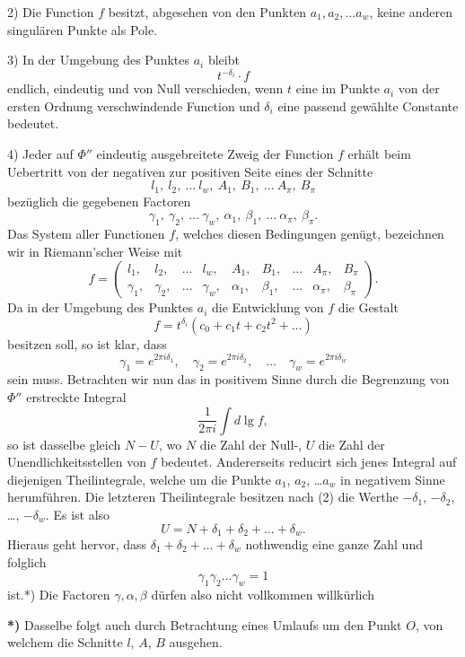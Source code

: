\documentclass{article}
\begin{document}
2) Die Function $f$ besitzt, abgesehen von den Punkten $a_1, a_2, \dots a_w$, keine anderen singulären Punkte als Pole.

3) In der Umgebung des Punktes $a_i$ bleibt
\[
t^{-\delta_i} \cdot f
\]
endlich, eindeutig und von Null verschieden, wenn $t$ eine im Punkte $a_i$ von der ersten Ordnung verschwindende Function und $\delta_i$ eine passend gewählte Constante bedeutet.

4) Jeder auf $\Phi''$ eindeutig ausgebreitete Zweig der Function $f$ erhält beim Uebertritt von der negativen zur positiven Seite eines der Schnitte
\[
l_1, \ l_2, \ \dots \ l_w, \ A_1, \ B_1, \ \dots \ A_\pi, \ B_\pi
\]
bezüglich die gegebenen Factoren
\[
\gamma_1, \ \gamma_2, \ \dots \ \gamma_w, \ \alpha_1, \ \beta_1, \ \dots \ \alpha_\pi, \ \beta_\pi.
\]
Das System aller Functionen $f$, welches diesen Bedingungen genügt, bezeichnen wir in Riemann'scher Weise mit
\[
f = \begin{pmatrix}
l_1, & l_2, & \dots & l_w, & A_1, & B_1, & \dots & A_\pi, & B_\pi \\
\gamma_1, & \gamma_2, & \dots & \gamma_w, & \alpha_1, & \beta_1, & \dots & \alpha_\pi, & \beta_\pi
\end{pmatrix}. \tag{1}
\]
Da in der Umgebung des Punktes $a_i$ die Entwicklung von $f$ die Gestalt
\[
f = t^{\delta_i}(c_0 + c_1 t + c_2 t^2 + \dots) \tag{2}
\]
besitzen soll, so ist klar, dass
\[
\gamma_1 = e^{2\pi i\delta_1}, \quad \gamma_2 = e^{2\pi i\delta_2}, \quad \dots \quad \gamma_w = e^{2\pi i\delta_w} \tag{3}
\]
sein muss. Betrachten wir nun das in positivem Sinne durch die Begrenzung von $\Phi''$ erstreckte Integral
\[
\frac{1}{2\pi i}\int d\lg f,
\]
so ist dasselbe gleich $N - U$, wo $N$ die Zahl der Null-, $U$ die Zahl der Unendlichkeitsstellen von $f$ bedeutet. Andererseits reducirt sich jenes Integral auf diejenigen Theilintegrale, welche um die Punkte $a_1$, $a_2$, \dots $a_w$ in negativem Sinne herumführen. Die letzteren Theilintegrale besitzen nach (2) die Werthe $-\delta_1$, $-\delta_2$, \dots, $-\delta_w$. Es ist also
\[
U = N + \delta_1 + \delta_2 + \dots + \delta_w. \tag{4}
\]
Hieraus geht hervor, dass $\delta_1 + \delta_2 + \dots + \delta_w$ nothwendig eine ganze Zahl und folglich
\[
\gamma_1 \gamma_2 \dots \gamma_w = 1 \tag{5}
\]
ist.*) Die Factoren $\gamma, \alpha, \beta$ dürfen also nicht vollkommen willkürlich

\textbf{*)} Dasselbe folgt auch durch Betrachtung eines Umlaufs um den Punkt $O$, von welchem die Schnitte $l$, $A$, $B$ ausgehen.
\end{document}
